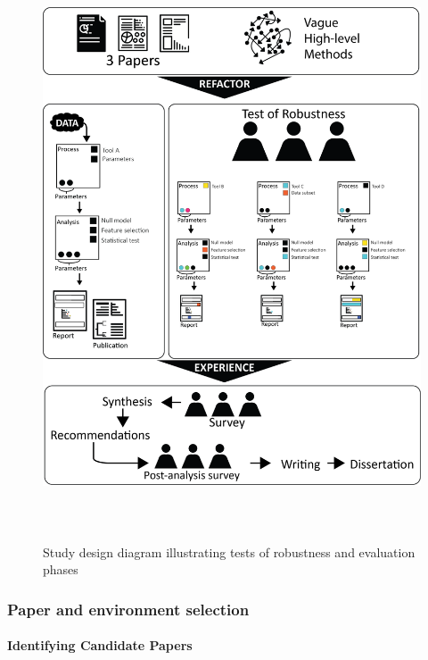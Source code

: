 \documentclass{drexelthesis}
\begin{document}
\begin{figure}[h!]
	\centering
	\includegraphics[width=13.76cm,height=17.36cm]{./images/studydesign.png}
	\caption{Study design diagram illustrating tests of robustness and evaluation phases}
	\label{studydesign}
\end{figure}



\subsubsection{Paper and environment selection}

\paragraph{Identifying Candidate Papers}
\end{document}
